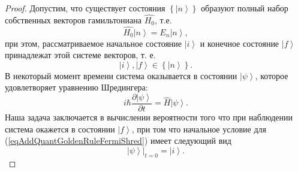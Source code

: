 \begin{proof}
  Допустим, что существует состояния
  $\left\{\left|n\right>\right\}$ образуют полный набор собственных
  векторов гамильтониана $\hat{H_0}$, т.е.
  \begin{equation}
    \hat{H_0} \left| n \right> = E_n \left| n \right>,
    \nonumber
  \end{equation}
  при этом, рассматриваемое начальное состояние  $\left|i\right>$ и
  конечное состояние $\left|f\right>$ принадлежат этой системе
  векторов, т. е.
  \begin{equation}
    \left|i\right>, \left|f\right> \in \left\{\left|n\right>\right\}.
    \nonumber
  \end{equation}
  В некоторый момент времени система оказывается в состоянии
  $\left|\psi\right>$, которое удовлетворяет уравнению Шредингера:
  \begin{equation}
    i \hbar \frac{\partial \left|\psi\right>}{\partial t} =
    \hat{H} \left|\psi\right>.
    \label{eqAddQuantGoldenRuleFermiShred}
  \end{equation}
  Наша задача заключается в вычислении вероятности того что при
  наблюдении система окажется в состоянии $\left|f\right>$, при том
  что начальное условие для (\ref{eqAddQuantGoldenRuleFermiShred})
  имеет следующий вид
  \begin{equation}
    \left.\left|\psi\right>\right|_{t=0} = \left|i\right>.
    \label{eqAddQuantGoldenRuleFermiInitialCond}
  \end{equation}


\end{proof}
